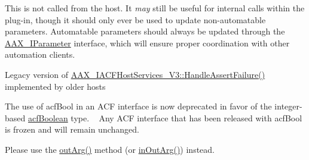 \begin{DoxyRefList}
%
This is not called from the host. It {\itshape may} still be useful for internal calls within the plug-\/in, though it should only ever be used to update non-\/automatable parameters. Automatable parameters should always be updated through the \mbox{\hyperlink{class_a_a_x___i_parameter}{A\+A\+X\+\_\+\+I\+Parameter}} interface, which will ensure proper coordination with other automation clients. 
\item[Member \mbox{\hyperlink{class_a_a_x___i_a_c_f_host_services_a49111de18abd12b671ae16138e244af3}{A\+A\+X\+\_\+\+I\+A\+C\+F\+Host\+Services::Assert}} (const char $\ast$i\+File, int32\+\_\+t i\+Line, const char $\ast$i\+Note)=0]\label{deprecated__deprecated000271}%
%
Legacy version of \mbox{\hyperlink{class_a_a_x___i_a_c_f_host_services___v3_aaaddbd89dd3d6dd2e9e9def5b99c579f}{A\+A\+X\+\_\+\+I\+A\+C\+F\+Host\+Services\+\_\+\+V3\+::\+Handle\+Assert\+Failure()}} implemented by older hosts 
\item[Member \mbox{\hyperlink{acfbasetypes_8h_ab14f16ef9317b9c6f3b65b29b2d43ea2}{acf\+Bool}} ]\label{deprecated__deprecated000276}%
%
The use of acf\+Bool in an A\+CF interface is now deprecated in favor of the integer-\/based \mbox{\hyperlink{acfbasetypes_8h_aeedec2f89cfe8ab3776482a35fae7d0f}{acf\+Boolean}} type. ~\newline
 Any A\+CF interface that has been released with acf\+Bool is frozen and will remain unchanged.  
\item[Member \mbox{\hyperlink{class_a_c_f_ptr_af3f4b659cbbbf774c4b6d2b31fc6e289}{A\+C\+F\+Ptr$<$ T $>$::operator\&}} ()]\label{deprecated__deprecated000277}%
%
Please use the \mbox{\hyperlink{class_a_c_f_ptr_a5cc902fa6044ddadf058f139d262d073}{out\+Arg()}} method (or \mbox{\hyperlink{class_a_c_f_ptr_a3fdcb6ca022b312a4131d766a36abf3d}{in\+Out\+Arg()}}) instead. ~\newline
  

\end{DoxyRefList}
